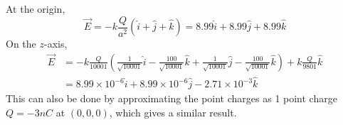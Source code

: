 \documentclass[answers]{exam}
\begin{document}
\begin{questions}

\begin{solution}
	At the origin,
	$$\vec{E} = -k\frac{Q}{a^2}(\hat{i} + \hat{j} + \hat{k}) = 8.99\hat{i} + 8.99\hat{j} + 8.99\hat{k}$$
	On the $z$-axis,
	\begin{align*}
		\vec{E} &= -k\frac{Q}{10001}\left(\frac{1}{\sqrt{10001}}\hat{i} - \frac{100}{\sqrt{10001}}\hat{k} + \frac{1}{\sqrt{10001}}\hat{j} - \frac{100}{\sqrt{10001}}\hat{k}\right) + k\frac{Q}{9801}\hat{k} \\
			&= 8.99\times 10^{-6}\hat{i} + 8.99\times 10^{-6}\hat{j} - 2.71\times 10^{-3}\hat{k}
	\end{align*}
	This can also be done by approximating the point charges as 1 point charge $Q = -3\unit{nC}$ at $(0,0,0)$, which gives a similar result.
\end{solution}
\end{questions}
\end{document}
